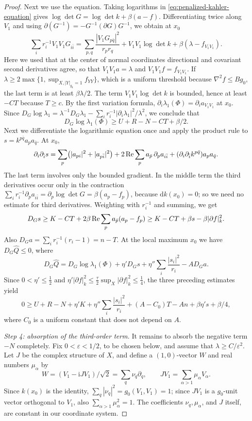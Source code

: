 \begin{proof}
Next we use the equation. Taking logarithms in \eqref{eq:penalized-kahler-equation} gives $\log\det G=\log\det k+\beta(a-f)$. Differentiating twice along $V_1$ and using $\partial(G^{-1})=-G^{-1}(\partial G)G^{-1}$, we obtain at $x_0$
\[
 \sum_i r_i^{-1}V_1V_1G_{i\bar i}
  =\sum_{p,q}\frac{|V_1G_{p\bar q}|^2}{r_pr_q}
       +V_1V_1\log\det k+\beta(\lambda-f_{V_1V_1}).
\]
Here we used that at the center of normal coordinates directional and covariant second derivatives agree, so that $V_1V_1a=\lambda$ and $V_1V_1f=f_{V_1V_1}$. If $\lambda\geq2\max\{1,\sup_{X,|Y|_{g_0}=1}f_{YY}\}$, which is a uniform threshold because $\nabla^2f\leq Bg_0$, the last term is at least $\beta\lambda/2$. The term $V_1V_1\log\det k$ is bounded, hence at least $-CT$ because $T\geq c$. By the first variation formula, $\partial_i\lambda_1(\Phi)=\partial_i a_{V_1V_1}$ at $x_0$. Since $D_G\log\lambda_1=\lambda^{-1}D_G\lambda_1-\sum_ir_i^{-1}|\partial_i\lambda_1|^2/\lambda^2$, we conclude that
\[
 D_G\log\lambda_1(\Phi)\geq U+R-N-CT+\beta/2.
\]
Next we differentiate the logarithmic equation once and apply the product rule to $s=k^{p\bar q}a_pa_{\bar q}$. At $x_0$,
\[
 \partial_i\partial_{\bar i}s=\sum_p\bigl(|a_{pi}|^2+|a_{p\bar i}|^2\bigr)
   +2\operatorname{Re}\sum_pa_{\bar p}\,\partial_pa_{i\bar i}
   +(\partial_i\partial_{\bar i}k^{p\bar q})a_pa_{\bar q}.
\]
The last term involves only the bounded gradient. In the middle term the third derivatives occur only in the contraction $\sum_ir_i^{-1}\partial_pa_{i\bar i}=\partial_p\log\det G=\beta(a_p-f_p)$, because $\mathrm dk(x_0)=0$; so we need no estimate for third derivatives. Weighting with $r_i^{-1}$ and summing, we get
\[
 D_Gs\geq K-CT
           +2\beta\operatorname{Re}\sum_p a_{\bar p}(a_p-f_p)
       \geq K-CT+\beta s-\beta|\partial f|_k^2.
\]
Also $D_Ga=\sum_ir_i^{-1}(r_i-1)=n-T$. At the local maximum $x_0$ we have $D_G\widehat Q\leq0$, where
\[
 D_G\widehat Q=D_G\log\lambda_1(\Phi)+\eta'D_Gs
   +\eta''\sum_i\frac{|s_i|^2}{r_i}-AD_Ga.
\]
Since $0<\eta'\leq\frac12$ and $\eta'|\partial f|_k^2\leq\frac\tau2\sup_X|\partial f|_k^2\leq\frac14$, the three preceding estimates yield
\begin{equation}\label{eq:real-hessian-maximum}
 0\geq U+R-N+\eta'K
       +\eta''\sum_i\frac{|s_i|^2}{r_i}
       +(A-C_0)T-An+\beta\eta's+\beta/4,
\end{equation}
where $C_0$ is a uniform constant that does not depend on $A$.

\emph{Step 4: absorption of the third-order term.} It remains to absorb the negative term $-N$ completely. Fix $0<\varepsilon<1/2$, to be chosen below, and assume that $\lambda\geq C/\varepsilon^2$. Let $J$ be the complex structure of $X$, and define a $(1,0)$-vector $W$ and real numbers $\mu_\alpha$ by
\[
 W=(V_1-\mathrm iJV_1)/\sqrt2
       =\sum_q\nu_q\partial_q,\qquad
 JV_1=\sum_{\alpha>1}\mu_\alpha V_\alpha.
\]
Since $k(x_0)$ is the identity, $\sum_q|\nu_q|^2=g_0(V_1,V_1)=1$; since $JV_1$ is a $g_0$-unit vector orthogonal to $V_1$, also $\sum_{\alpha>1}\mu_\alpha^2=1$. The coefficients $\nu_q,\mu_\alpha$, and $J$ itself, are constant in our coordinate system.


\end{proof}
